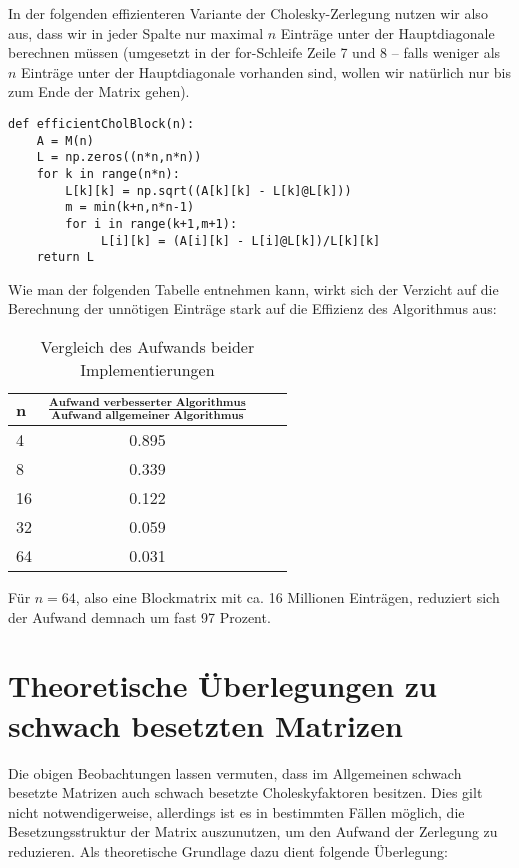 \documentclass{article}
\begin{document}
In der folgenden effizienteren Variante der Cholesky-Zerlegung nutzen wir also aus, dass wir in jeder Spalte nur maximal $n$ Einträge unter der Hauptdiagonale berechnen müssen (umgesetzt in der for-Schleife Zeile 7 und 8 -- falls weniger als $n$ Einträge unter der Hauptdiagonale vorhanden sind, wollen wir natürlich nur bis zum Ende der Matrix gehen).

\lstset{language=Python}
\lstset{frame=lines}
\lstset{basicstyle=\footnotesize}
\begin{lstlisting}
def efficientCholBlock(n):
    A = M(n)
    L = np.zeros((n*n,n*n))
    for k in range(n*n):
        L[k][k] = np.sqrt((A[k][k] - L[k]@L[k]))
        m = min(k+n,n*n-1)
        for i in range(k+1,m+1):
             L[i][k] = (A[i][k] - L[i]@L[k])/L[k][k]
    return L
\end{lstlisting}

Wie man der folgenden Tabelle entnehmen kann, wirkt sich der Verzicht auf die Berechnung der unnötigen Einträge stark auf die Effizienz des Algorithmus aus:


\begin{table}[htb]
\centering
\caption{Vergleich des Aufwands beider Implementierungen}
\begin{tabular}{lccc}
\toprule
\textbf{n}
&\textbf{$\frac{\mathrm{\textbf{Aufwand verbesserter Algorithmus}}}{\mathrm{\textbf{Aufwand allgemeiner Algorithmus}}}$}  & \\
	        \midrule
4 & 0.895 \\
8 & 0.339 \\
16& 0.122 \\
32& 0.059 \\
64& 0.031 \\
\end{tabular}
\end{table}

Für $n=64$, also eine Blockmatrix mit ca. 16 Millionen Einträgen, reduziert sich der Aufwand demnach um fast 97 Prozent.

\section{Theoretische Überlegungen zu schwach besetzten Matrizen}

Die obigen Beobachtungen lassen vermuten, dass im Allgemeinen schwach besetzte Matrizen auch schwach besetzte Choleskyfaktoren besitzen. Dies gilt nicht notwendigerweise, allerdings ist es in bestimmten Fällen möglich, die Besetzungsstruktur der Matrix auszunutzen, um den Aufwand der Zerlegung zu reduzieren. Als theoretische Grundlage dazu dient folgende Überlegung:
\end{document}
